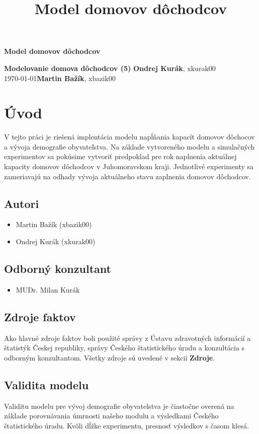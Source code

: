 \documentclass[a4paper, 11pt]{article}
\title{Model domovov dôchodcov}
\begin{document}
\begin{center}
\Large \textbf{Model domovov dôchodcov}
\end{center}
\noindent
\large{\textbf{Modelovanie domova dôchodcov (5)}} \hfill \textbf{Ondrej Kurák}, xkurak00 \\
\today \hfill \textbf{Martin Bažík}, xbazik00 \\


\section{Úvod}
V tejto práci je riešená implentácia modelu\cite[str. 7]{IMS} napĺňania kapacít domovov dôchocov a vývoja demografie obyvateľstva. Na základe vytvoreného modelu a simulačných experimentov\cite[str. 8]{IMS} sa pokúsime vytvoriť predpoklad pre rok naplnenia aktuálnej kapacity domovov dôchodcov v Juhomoravskom kraji. Jednotlivé experimenty sa zameriavajú na odhady vývoja aktuálneho stavu zaplnenia domovov dôchodcov.
\subsection{Autori}
\begin{itemize}
\item Martin Bažík (xbazik00)
\item Ondrej Kurák (xkurak00)
\end{itemize}
\subsection{Odborný konzultant}
\begin{itemize}
\item MUDr. Milan Kurák
\end{itemize}
\subsection{Zdroje faktov}
Ako hlavné zdroje faktov boli použité správy z Ústavu zdravotných informácií a štatistýk Českej republiky\cite{demografia}\cite{domovy}, správy Českého štatistického úradu\cite{zomreli} a konzultácia s odborným konzultantom. Všetky zdroje sú uvedené v sekcii \textbf{Zdroje}.  
\subsection{Validita modelu}
Validitu modelu\cite[str. 37]{IMS} pre vývoj demografie obyvatelstva je čiastočne overená na základe porovnávania úmrnosti našeho modulu a výsledkami Českého štatistického úradu\cite{lifet}. Kvôli dĺžke experimentu, presnosť výsledkov s časom klesá.
\end{document}
